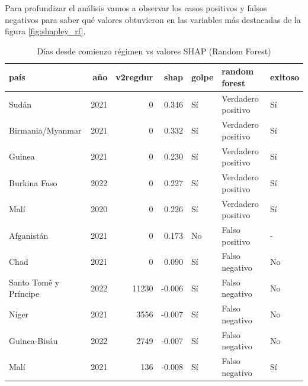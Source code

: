 \documentclass{article}
\begin{document}

Para profundizar el análisis vamos a observar los casos positivos y falsos negativos para
saber qué valores obtuvieron en las variables más destacadas de la figura \ref{fig:shapley_rf}.

\begin{table}[H]
  \centering

  \begin{tabular}{lrrrlll}
    \toprule
    país & año & v2regdur & shap & golpe & random forest & exitoso \\
    \midrule
    Sudán & 2021 & 0 & 0.346 & Sí & Verdadero positivo & Sí \\
    Birmania/Myanmar & 2021 & 0 & 0.332 & Sí & Verdadero positivo & Sí \\
    Guinea & 2021 & 0 & 0.230 & Sí & Verdadero positivo & Sí \\
    Burkina Faso & 2022 & 0 & 0.227 & Sí & Verdadero positivo & Sí \\
    Malí & 2020 & 0 & 0.226 & Sí & Verdadero positivo & Sí \\
    Afganistán & 2021 & 0 & 0.173 & No & Falso positivo & - \\
    Chad & 2021 & 0 & 0.090 & Sí & Falso negativo & No \\
    Santo Tomé y Príncipe & 2022 & 11230 & -0.006 & Sí & Falso negativo & No \\
    Níger & 2021 & 3556 & -0.007 & Sí & Falso negativo & No \\
    Guinea-Bisáu & 2022 & 2749 & -0.007 & Sí & Falso negativo & No \\
    Malí & 2021 & 136 & -0.008 & Sí & Falso negativo & Sí \\
    \bottomrule
    \end{tabular} 
  \caption{Días desde comienzo régimen vs valores SHAP (Random Forest) \label{tab:shap_rf_regdur}}
\end{table}
\end{document}
